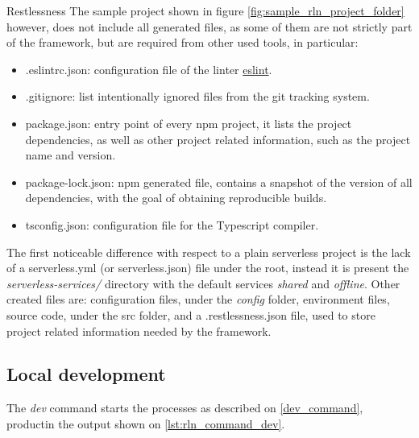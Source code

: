 \begin{chapter}{Restlessness}
    The sample project shown in figure \ref{fig:sample_rln_project_folder} however,
    does not include all generated files, as some of them are not strictly part of
    the framework, but are required from other used tools, in particular:
    \begin{itemize}
        \item .eslintrc.json: configuration file of the linter
            \href{https://eslint.org/}{eslint}.
        \item .gitignore: list intentionally ignored files from the git tracking
            system.
        \item package.json: entry point of every npm project, it lists the project
            dependencies, as well as other project related information, such as
            the project name and version.
        \item package-lock.json: npm generated file, contains a snapshot of the
            version of all dependencies, with the goal of obtaining reproducible
            builds.
        \item tsconfig.json: configuration file for the Typescript compiler.
    \end{itemize}

    The first noticeable difference with respect to a plain serverless project is the
    lack of a serverless.yml (or serverless.json) file under the root, instead it
    is present the \textit{serverless-services/} directory with the default services
    \textit{shared} and \textit{offline}.
    Other created files are: configuration files, under the \textit{config} folder,
    environment files, source code, under the src folder, and a .restlessness.json
    file, used to store project related information needed by the framework.

    \subsection{Local development}
    \label{sec:local_dev}

    The \textit{dev} command starts the processes as described on \ref{dev_command},
    productin the output shown on \ref{lst:rln_command_dev}.

    \bigskip


\end{chapter}
